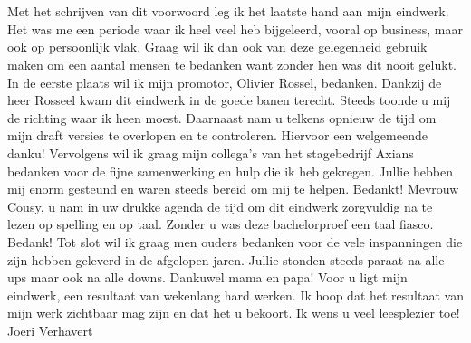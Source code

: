 
\chapter*{}


Met het schrijven van dit voorwoord leg ik het laatste hand aan mijn eindwerk. Het was me een periode waar ik heel veel heb bijgeleerd, vooral op business, maar ook op persoonlijk vlak.  Graag wil ik dan ook van deze gelegenheid gebruik maken om een aantal mensen te bedanken want zonder hen was dit nooit gelukt. 
\newline
\newline
In de eerste plaats wil ik mijn promotor, Olivier Rossel, bedanken. Dankzij de heer Rosseel kwam dit eindwerk in de goede banen terecht. Steeds toonde u mij de richting waar ik heen moest. Daarnaast nam u telkens opnieuw de tijd om mijn draft versies te overlopen en te controleren. Hiervoor een welgemeende danku!
\newline
\newline
Vervolgens wil ik graag mijn collega’s van het stagebedrijf Axians bedanken voor de fijne samenwerking en hulp die ik heb gekregen. Jullie hebben mij enorm gesteund en waren steeds bereid om mij te helpen. Bedankt!
\newline
\newline
Mevrouw Cousy, u nam in uw drukke agenda de tijd om dit eindwerk zorgvuldig na te lezen op spelling en op taal. Zonder u was deze bachelorproef een taal fiasco. Bedank!
\newline
\newline
Tot slot wil ik graag men ouders bedanken voor de vele inspanningen die zijn hebben geleverd in de afgelopen jaren. Jullie stonden steeds paraat na alle ups maar ook na alle downs. Dankuwel mama en papa!
\newline
\newline
Voor u ligt mijn eindwerk, een resultaat van wekenlang hard werken. Ik hoop dat het resultaat van mijn werk zichtbaar mag zijn en dat het u bekoort. 
\newline
\newline
Ik wens u veel leesplezier toe!
\newline
Joeri Verhavert




